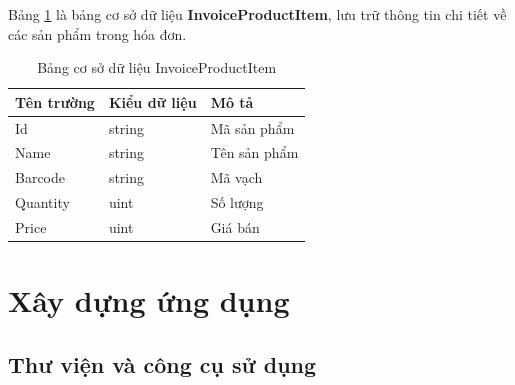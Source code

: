 \documentclass[../DoAn.tex]{subfiles}
\begin{document}
Bảng \ref{table:database_invoiceproductitem} là bảng cơ sở dữ liệu \textbf{InvoiceProductItem}, lưu trữ thông tin chi tiết về các sản phẩm trong hóa đơn.
\begin{table}[H]
    \centering
    \begin{tabularx}{\textwidth}{|p{4cm}|p{3cm}|X|}
        \hline
        \textbf{Tên trường} & \textbf{Kiểu dữ liệu} & \textbf{Mô tả} \\ \hline
        Id                  & string                & Mã sản phẩm    \\ \hline
        Name                & string                & Tên sản phẩm   \\ \hline
        Barcode             & string                & Mã vạch        \\ \hline
        Quantity            & uint                  & Số lượng       \\ \hline
        Price               & uint                  & Giá bán        \\ \hline
    \end{tabularx}
    \caption{Bảng cơ sở dữ liệu InvoiceProductItem}
    \label{table:database_invoiceproductitem}
\end{table}
\break


\section{Xây dựng ứng dụng}
\label{section:implementation}

\subsection{Thư viện và công cụ sử dụng}
\label{subsection:implementation-toolkit}
\end{document}

